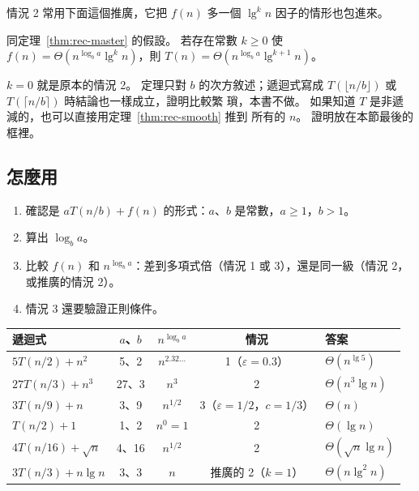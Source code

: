 情況 2 常用下面這個推廣，它把 $f(n)$ 多一個 $\lg^k n$ 因子的情形也包進來。

\begin{theorem}[推廣的情況 2]
\label{thm:rec-master2}
同定理~\ref{thm:rec-master} 的假設。 若存在常數 $k \ge 0$ 使
$f(n) = \Theta(n^{\log_b a} \lg^k n)$，則 $T(n) = \Theta(n^{\log_b a} \lg^{k+1} n)$。
\end{theorem}

$k = 0$ 就是原本的情況 2。 定理只對 $b$ 的次方敘述；遞迴式寫成
$T(\lfloor n/b \rfloor)$ 或 $T(\lceil n/b \rceil)$ 時結論也一樣成立，證明比較繁
瑣，本書不做。 如果知道 $T$ 是非遞減的，也可以直接用定理~\ref{thm:rec-smooth} 推到
所有的 $n$。 證明放在本節最後的框裡。

\subsection{怎麼用}

\begin{enumerate}
\item 確認是 $aT(n/b) + f(n)$ 的形式：$a$、$b$ 是常數，$a \ge 1$，$b > 1$。
\item 算出 $\log_b a$。
\item 比較 $f(n)$ 和 $n^{\log_b a}$：差到多項式倍（情況 1 或 3），還是同一級（情況
2，或推廣的情況 2）。
\item 情況 3 還要驗證正則條件。
\end{enumerate}

\begin{center}
\begin{tabular}{lcccl}
\toprule
遞迴式 & $a$、$b$ & $n^{\log_b a}$ & 情況 & 答案 \\
\midrule
$5T(n/2) + n^2$ & 5、2 & $n^{2.32\ldots}$ & 1（$\varepsilon = 0.3$） & $\Theta(n^{\lg 5})$ \\
$27T(n/3) + n^3$ & 27、3 & $n^3$ & 2 & $\Theta(n^3 \lg n)$ \\
$3T(n/9) + n$ & 3、9 & $n^{1/2}$ & 3（$\varepsilon = 1/2$，$c = 1/3$） & $\Theta(n)$ \\
$T(n/2) + 1$ & 1、2 & $n^0 = 1$ & 2 & $\Theta(\lg n)$ \\
$4T(n/16) + \sqrt{n}$ & 4、16 & $n^{1/2}$ & 2 & $\Theta(\sqrt{n} \lg n)$ \\
$3T(n/3) + n \lg n$ & 3、3 & $n$ & 推廣的 2（$k = 1$） & $\Theta(n \lg^2 n)$ \\
\bottomrule
\end{tabular}
\end{center}

